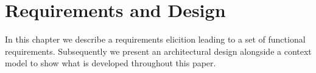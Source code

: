 \chapter{Requirements and Design}
In this chapter we describe a requirements elicition leading to a set of functional requirements.
Subsequently we present an architectural design alongside a context model to show what is developed throughout this paper.
